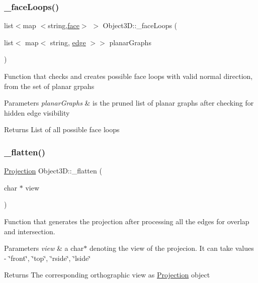 \subsubsection{\texorpdfstring{\+\_\+face\+Loops()}{\_faceLoops()}}
{\footnotesize\ttfamily list$<$map $<$string,\mbox{\hyperlink{structface}{face}}$>$ $>$ Object3\+D\+::\+\_\+face\+Loops (\begin{DoxyParamCaption}\item[{list$<$ map$<$ string, \mbox{\hyperlink{structedge}{edge}} $>$$>$}]{planar\+Graphs }\end{DoxyParamCaption})\hspace{0.3cm}{\ttfamily [protected]}}

Function that checks and creates possible face loops with valid normal direction, from the set of planar grpahs 
\begin{DoxyParams}{Parameters}
{\em planar\+Graphs} & is the pruned list of planar graphs after checking for hidden edge visibility \\
\hline
\end{DoxyParams}
\begin{DoxyReturn}{Returns}
List of all possible face loops 
\end{DoxyReturn}
\mbox{\label{class_object3_d_a98ba9cef74b1c75841beb109d5dbe270}} 
\subsubsection{\texorpdfstring{\+\_\+flatten()}{\_flatten()}}
{\footnotesize\ttfamily \mbox{\hyperlink{class_projection}{Projection}} Object3\+D\+::\+\_\+flatten (\begin{DoxyParamCaption}\item[{char $\ast$}]{view }\end{DoxyParamCaption})\hspace{0.3cm}{\ttfamily [protected]}}

Function that generates the projection after processing all the edges for overlap and intersection. 
\begin{DoxyParams}{Parameters}
{\em view} & a char$\ast$ denoting the view of the projecion. It can take values -\/ \char`\"{}front\char`\"{}, \char`\"{}top\char`\"{}, \char`\"{}rside\char`\"{}, \char`\"{}lside\char`\"{} \\
\hline
\end{DoxyParams}
\begin{DoxyReturn}{Returns}
The corresponding orthographic view as \mbox{\hyperlink{class_projection}{Projection}} object 
\end{DoxyReturn}
\mbox{\label{class_object3_d_ab9e9d4a2b40223c7f4edaec90e99bf79}} 
